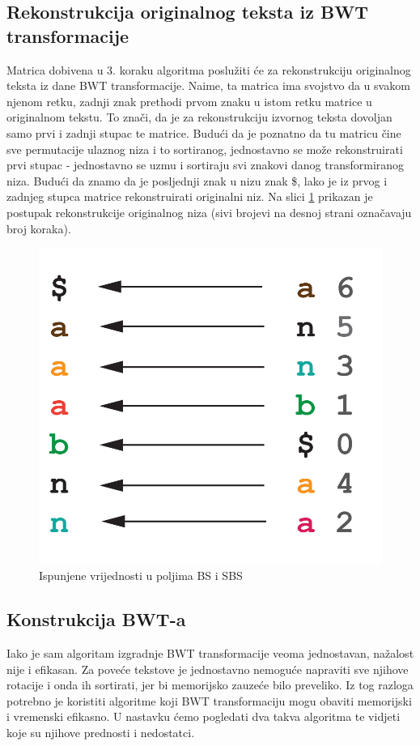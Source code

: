\subsection{Rekonstrukcija originalnog teksta iz BWT transformacije}
Matrica dobivena u 3. koraku algoritma poslužiti će za rekonstrukciju originalnog teksta iz dane BWT transformacije. Naime, ta matrica ima svojstvo da u svakom njenom retku, zadnji znak prethodi prvom znaku u istom retku matrice u originalnom tekstu. To znači, da je za rekonstrukciju izvornog teksta dovoljan samo prvi i zadnji stupac te matrice. Budući da je poznatno da tu matricu čine sve permutacije ulaznog niza i to sortiranog, jednostavno se može rekonstruirati prvi stupac - jednostavno se uzmu i sortiraju svi znakovi danog transformiranog niza. Budući da znamo da je posljednji znak u nizu znak \$, lako je iz prvog i zadnjeg stupca matrice rekonstruirati originalni niz. Na slici \ref{bwt2} prikazan je postupak rekonstrukcije originalnog niza (sivi brojevi na desnoj strani označavaju broj koraka).

\begin{figure}[H]
\centering
\includegraphics[scale=0.2]{./pictures/reverseBWT.jpg}
\caption{Ispunjene vrijednosti u poljima BS i SBS}\label{bwt2}
\end{figure}

\subsection{Konstrukcija BWT-a}
Iako je sam algoritam izgradnje BWT transformacije veoma jednostavan, nažalost nije i efikasan. Za poveće tekstove je jednostavno nemoguće napraviti sve njihove rotacije i onda ih sortirati, jer bi memorijsko zauzeće bilo preveliko. Iz tog razloga potrebno je koristiti algoritme koji BWT transformaciju mogu obaviti memorijski i vremenski efikasno. U nastavku ćemo pogledati dva takva algoritma te vidjeti koje su njihove prednosti i nedostatci.

